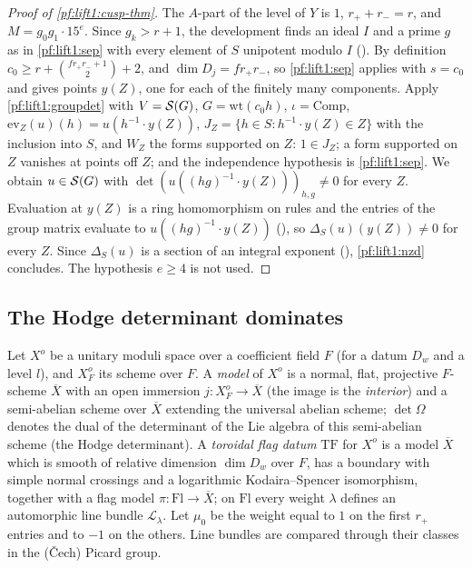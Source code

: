 \begin{proof}[Proof of \cref{pf:lift1:cusp-thm}]
The $A$-part of the level of $Y$ is $1$, $r_++r_-=r$, and $M=g_0g_1\cdot15^e$. Since $g_k>r+1$, the
development finds an ideal $I$ and a prime $g$ as in \cref{pf:lift1:sep} with every element of $S$
unipotent modulo $I$ (). By definition
$c_0\ge r+\binom{f r_+r_-+1}2+2$, and $\dim D_j=fr_+r_-$, so \cref{pf:lift1:sep} applies with
$s=c_0$ and gives points $y(Z)$, one for each of the finitely many components. Apply
\cref{pf:lift1:groupdet} with $V=\mathcal S(G)$, $G=\mathrm{wt}(c_0h)$, $\iota=\mathrm{Comp}$,
$\mathrm{ev}_Z(u)(h)=u(h^{-1}\cdot y(Z))$, $J_Z=\{h\in S:h^{-1}\cdot y(Z)\in Z\}$ with the inclusion into
$S$, and $W_Z$ the forms supported on $Z$: $1\in J_Z$; a form supported on $Z$ vanishes at points off
$Z$; and the independence hypothesis is \cref{pf:lift1:sep}. We obtain $u\in\mathcal S(G)$ with
$\det(u((hg)^{-1}\cdot y(Z)))_{h,g}\ne0$ for every $Z$. Evaluation at $y(Z)$ is a ring homomorphism on
rules and the entries of the group matrix evaluate to $u((hg)^{-1}\cdot y(Z))$
(), so $\Delta_S(u)(y(Z))\ne0$ for every $Z$. Since
$\Delta_S(u)$ is a section of an integral exponent
(), \cref{pf:lift1:nzd} concludes. The hypothesis $e\ge4$ is not used.
\end{proof}

\subsection{The Hodge determinant dominates}\label{pf:lift1:hodge}

Let $X^o$ be a unitary moduli space over a coefficient field $F$ (for a datum $D_w$ and a level $l$), and
$X^o_F$ its scheme over $F$. A \emph{model} of $X^o$ is a normal, flat, projective $F$-scheme $\overline X$
with an open immersion $j\colon X^o_F\to\overline X$ (the image is the \emph{interior}) and a
semi-abelian scheme over $\overline X$ extending the universal abelian scheme; $\det\Omega$ denotes the
dual of the determinant of the Lie algebra of this semi-abelian scheme (the Hodge determinant). A
\emph{toroidal flag datum} $\mathrm{TF}$ for $X^o$ is a model $\overline X$ which is smooth of relative
dimension $\dim D_w$ over $F$, has a boundary with simple normal crossings and a logarithmic
Kodaira--Spencer isomorphism, together with a flag model $\pi\colon\mathrm{Fl}\to\overline X$; on
$\mathrm{Fl}$ every weight $\lambda$ defines an automorphic line bundle $\mathcal L_\lambda$. Let $\mu_0$
be the weight equal to $1$ on the first $r_+$ entries and to $-1$ on the others. Line bundles are
compared through their classes in the (\v{C}ech) Picard group.

